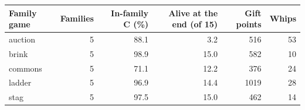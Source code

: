 \begin{tabular}{@{}lrrrrr@{}}
\toprule
Family game & Families & In-family C (\%) & Alive at the end (of 15) & Gift points & Whips \\
\midrule
auction & 5 & 88.1 & 3.2 & 516 & 53 \\
brink & 5 & 98.9 & 15.0 & 582 & 10 \\
commons & 5 & 71.1 & 12.2 & 376 & 24 \\
ladder & 5 & 96.9 & 14.4 & 1019 & 28 \\
stag & 5 & 97.5 & 15.0 & 462 & 14 \\
\bottomrule
\end{tabular}
